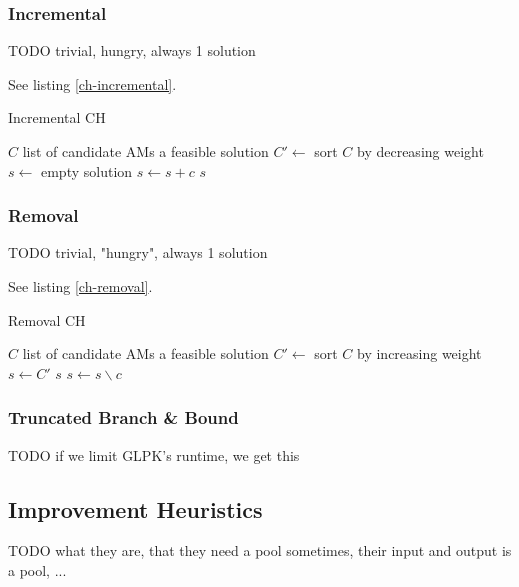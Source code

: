 \documentclass[a4paper,12pt,oneside]{report}
\begin{document}
\subsubsection{Incremental}

TODO trivial, hungry, always 1 solution

See listing \ref{ch-incremental}.

\begin{algorithm}
\caption{Incremental CH}
\label{ch-incremental}
\begin{algorithmic}
\REQUIRE $C$ list of candidate AMs
\ENSURE a feasible solution
\STATE $C' \gets $ sort $C$ by decreasing weight
\STATE $s \gets $ empty solution
    \STATE $s \gets s + c$
  \ENDIF
\ENDFOR
\RETURN $s$
\end{algorithmic}
\end{algorithm}

\subsubsection{Removal}

TODO trivial, "hungry", always 1 solution

See listing \ref{ch-removal}.

\begin{algorithm}
\caption{Removal CH}
\label{ch-removal}
\begin{algorithmic}
\REQUIRE $C$ list of candidate AMs
\ENSURE a feasible solution
\STATE $C' \gets $ sort $C$ by increasing weight
\STATE $s \gets C'$
    \RETURN $s$
  \ENDIF
  \STATE $s \gets s \backslash c$
\ENDFOR
\end{algorithmic}
\end{algorithm}

\subsubsection{Truncated Branch \& Bound}

TODO if we limit GLPK's runtime, we get this 

\subsection{Improvement Heuristics}


TODO what they are, that they need a pool sometimes, their input and output is a pool, ...
\end{document}

